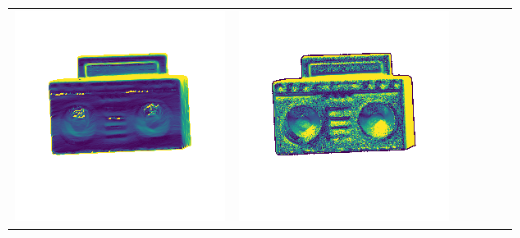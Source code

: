 \begin{tabularx}{\linewidth}{@{}Y@{}Y@{}Y@{}Y@{}Y@{}Y@{}}
\includegraphics[width=\linewidth]{semisynthetic/20160617_19_yu_err.png} &
\includegraphics[width=\linewidth]{semisynthetic/20160617_19_dpsn_err.png} &

\end{tabularx}
